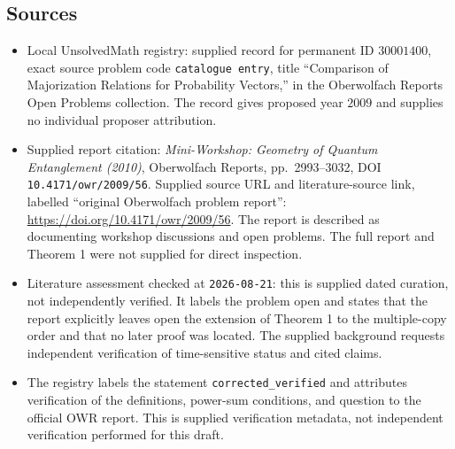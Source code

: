 \documentclass[11pt]{article}
\begin{document}
\subsection{Sources}
\begin{itemize}
\item Local UnsolvedMath registry: supplied record for permanent ID \(30001400\), exact source problem code \texttt{catalogue entry}, title ``Comparison of Majorization Relations for Probability Vectors,'' in the Oberwolfach Reports Open Problems collection. The record gives proposed year \(2009\) and supplies no individual proposer attribution.
\item Supplied report citation: \emph{Mini-Workshop: Geometry of Quantum Entanglement (2010)}, Oberwolfach Reports, pp.\ 2993--3032, DOI \texttt{10.4171/owr/2009/56}. Supplied source URL and literature-source link, labelled ``original Oberwolfach problem report'': \url{https://doi.org/10.4171/owr/2009/56}. The report is described as documenting workshop discussions and open problems. The full report and Theorem 1 were not supplied for direct inspection.
\item Literature assessment checked at \texttt{2026-08-21}: this is supplied dated curation, not independently verified. It labels the problem open and states that the report explicitly leaves open the extension of Theorem 1 to the multiple-copy order and that no later proof was located. The supplied background requests independent verification of time-sensitive status and cited claims.
\item The registry labels the statement \texttt{corrected\_verified} and attributes verification of the definitions, power-sum conditions, and question to the official OWR report. This is supplied verification metadata, not independent verification performed for this draft.
\end{itemize}
\end{document}
